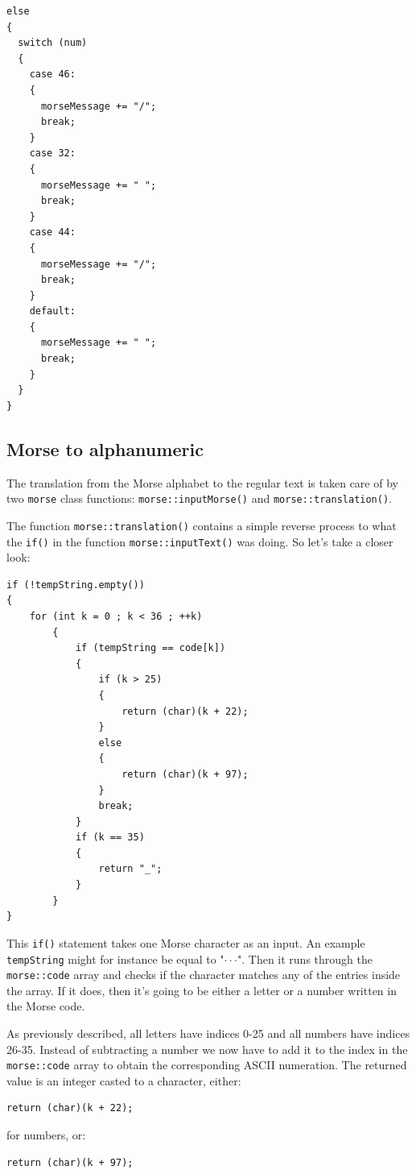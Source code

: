 \documentclass[10pt]{report}
\begin{document}
\begin{lstlisting}
else
{
  switch (num)
  {
    case 46:
    {
      morseMessage += "/";
      break;
    }
    case 32:
    {
      morseMessage += " ";
      break;
    }
    case 44:
    {
      morseMessage += "/";
      break;
    }
    default:
    {
      morseMessage += " ";
      break;
    }
  }
}
\end{lstlisting}

\newpage

\subsection{Morse to alphanumeric}

The translation from the Morse alphabet to the regular text is taken care of by two \verb|morse| class functions: \verb|morse::inputMorse()| and \verb|morse::translation()|.

The function \verb|morse::translation()| contains a simple reverse process to what the \verb|if()| in the function \verb|morse::inputText()| was doing. So let's take a closer look:


\begin{lstlisting}
if (!tempString.empty())
{
	for (int k = 0 ; k < 36 ; ++k)
		{
			if (tempString == code[k])
			{
				if (k > 25)
				{
					return (char)(k + 22);
				}
				else	
				{
					return (char)(k + 97);
				}
				break;
			}
			if (k == 35)	
			{
				return "_";
			}
		}
}
\end{lstlisting}

This \verb|if()| statement takes one Morse character as an input. An example \verb|tempString| might for instance be equal to "$\cdot\cdot$\text{-}$\cdot$". Then it runs through the \verb|morse::code| array and checks if the character matches any of the entries inside the array. If it does, then it's going to be either a letter or a number written in the Morse code.

As previously described, all letters have indices 0-25 and all numbers have indices 26-35. Instead of subtracting a number we now have to add it to the index in the \verb|morse::code| array to obtain the corresponding ASCII numeration. The returned value is an integer casted to a character, either:

\begin{lstlisting}
return (char)(k + 22);
\end{lstlisting}

for numbers, or:

\begin{lstlisting}
return (char)(k + 97);
\end{lstlisting}
\end{document}
